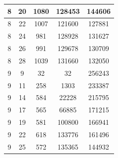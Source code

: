 \documentclass[a4paper,14pt]{extarticle}
\begin{document}
\begin{enumerate}[1.]
\begin{tabular}{|c|c|c|c|c|}
              \hline
              8                                  & 20                                & 1080                                    & 128453        & 144606 \\
              \hline
              8                                  & 22                                & 1007                                    & 121600        & 127881 \\
              \hline
              8                                  & 24                                & 981                                     & 128928        & 131627 \\
              \hline
              8                                  & 26                                & 991                                     & 129678        & 130709 \\
              \hline
              8                                  & 28                                & 1039                                    & 131660        & 132050 \\
              \hline
              9                                  & 9                                 & 32                                      & 32            & 256243 \\
              \hline
              9                                  & 11                                & 258                                     & 1303          & 233387 \\
              \hline
              9                                  & 14                                & 584                                     & 22228         & 215795 \\
              \hline
              9                                  & 17                                & 565                                     & 66885         & 171215 \\
              \hline
              9                                  & 19                                & 581                                     & 100800        & 166941 \\
              \hline
              9                                  & 22                                & 618                                     & 133776        & 161496 \\
              \hline
              9                                  & 25                                & 572                                     & 135365        & 144932 \\
              \hline

\end{tabular}
\end{enumerate}
\end{document}
